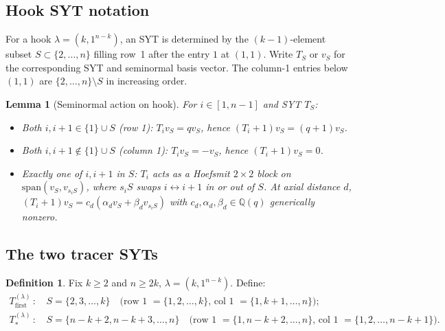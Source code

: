 \documentclass[11pt]{article}
\newtheorem{lemma}[theorem]{Lemma}
\theoremstyle{definition}
\newtheorem{definition}[theorem]{Definition}
\begin{document}
\subsection{Hook SYT notation}\label{sec:hook}

For a hook $\lambda = (k, 1^{n-k})$, an SYT is determined by the
$(k-1)$-element subset $S \subset \{2,\ldots,n\}$ filling row~1 after
the entry $1$ at $(1,1)$.  Write $T_S$ or $v_S$ for the corresponding
SYT and seminormal basis vector.  The column-1 entries below $(1,1)$
are $\{2,\ldots,n\} \setminus S$ in increasing order.

\begin{lemma}[Seminormal action on hook]\label{lem:hook-action}
For $i \in [1,n-1]$ and SYT $T_S$:
\begin{itemize}[leftmargin=2em,topsep=0.2em,itemsep=0.1em]
\item Both $i, i{+}1 \in \{1\}\cup S$ (row 1):
$T_i v_S = q v_S$, hence $(T_i{+}1) v_S = (q{+}1) v_S$.
\item Both $i, i{+}1 \notin \{1\}\cup S$ (column 1):
$T_i v_S = -v_S$, hence $(T_i{+}1) v_S = 0$.
\item Exactly one of $i, i{+}1$ in $S$: $T_i$ acts as a Hoefsmit
$2 \times 2$ block on $\mathrm{span}(v_S, v_{s_iS})$, where
$s_iS$ swaps $i \leftrightarrow i{+}1$ in or out of $S$.  At axial
distance $d$, $(T_i{+}1)v_S = c_d (\alpha_d v_S + \beta_d v_{s_iS})$
with $c_d, \alpha_d, \beta_d \in \mathbb{Q}(q)$ generically nonzero.
\end{itemize}
\end{lemma}

\subsection{The two tracer SYTs}

\begin{definition}\label{def:tracers}
Fix $k \ge 2$ and $n \ge 2k$, $\lambda = (k, 1^{n-k})$.  Define:
\begin{align*}
    T_{\mathrm{first}}^{(\lambda)} \,:\, & S = \{2, 3, \ldots, k\}
    \quad
    \text{(row 1 $= \{1, 2, \ldots, k\}$, col 1 $= \{1, k{+}1, \ldots, n\}$);}\\
    T_{*}^{(\lambda)} \,:\, & S = \{n{-}k{+}2, n{-}k{+}3, \ldots, n\}
    \quad
    \text{(row 1 $= \{1, n{-}k{+}2, \ldots, n\}$, col 1 $= \{1, 2, \ldots, n{-}k{+}1\}$).}
\end{align*}
\end{definition}
\end{document}
